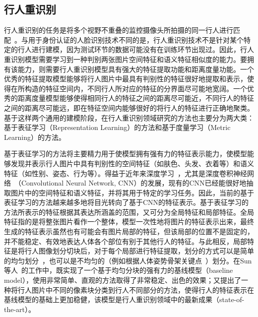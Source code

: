 \subsection{行人重识别}

行人重识别的任务是将多个视野不重叠的监控摄像头所拍摄的同一行人进行匹配~\cite{chen2018person}。与用于身份认证的人脸识别技术不同的是，行人重识别技术不是针对某个特定的行人进行建模，因为测试环节的数据可能没有在训练环节出现过。因此，行人重识别模型需要学习到一种判别两张图片空间特征和语义特征相似度的能力。要拥有该能力，则需要行人重识别模型具有强大的特征提取功能和距离度量功能。一个优秀的特征提取模型能够将行人图片中最具有判别性的特征很好地提取和表示，使得在所构造的特征空间内，不同行人所对应的特征的分界面尽可能地宽阔。一个优秀的距离度量模型能够使得相同行人的特征之间的距离尽可能近，不同行人的特征之间的距离尽可能远，即在特征空间内能够很好的将行人的特征进行正确地聚类。基于这样两个通用的建模阶段，在行人重识别领域研究的方法也主要分为两大类：基于表征学习（Representation Learning）的方法和基于度量学习（Metric Learning）的方法。

基于表征学习的方法将主要精力用于使模型拥有强有力的特征表示能力，使模型能够发现并表示行人图片中具有判别性的空间特征（如肤色、头发、衣着等）和语义特征（如性别、姿态、行为等）。得益于近年来深度学习~\cite{simonyan2014very}，尤其是深度卷积神经网络~\cite{krizhevsky2012imagenet}（Convolutional Neural Network, CNN）的发展，现有的CNN已经能很好地抽取图片中的空间特征和语义特征，并将其用于特定的学习任务。因此，当前的基于表征学习的方法越来越多地将目光转向了基于CNN的特征表示。基于表征学习的方法所表示的特征根据其表达所涵盖的范围，又可分为全局特征和局部特征。全局特征指的是将整张图片看作一个整体，模型一次性地将图片的特征表示出来，最终生成的特征表示虽然也有可能会有图片局部的特征，但该局部的位置不是固定的，并不能稳定、有效地表达人体各个部位有别于其他行人的特征。与此相反，局部特征是将行人图像划分切块后，对于每个局部进行特征提取，划分的方式可以是简单的均匀划分~\cite{sun2017beyond}，也可以是不均匀的（例如根据人体姿势骨架关键点~\cite{zheng2017pose}）划分。在Sun等人~\cite{sun2017beyond}的工作中，既实现了一个基于均匀分块的强有力的基线模型（baseline model），使用非常简单、直观的方法取得了非常稳定、出色的效果；又提出了一种将行人图片中不同的像素块分类到行人不同部分的方法，使得行人的特征表示在基线模型的基础上更加稳健，该模型是行人重识别领域中的最新成果（state-of-the-art）。

